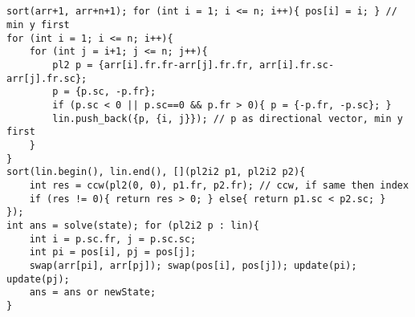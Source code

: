 \documentclass[landscape, 8pt, a4paper, oneside, twocolumn]{extarticle}
\begin{document}
\subsection{}
\begin{verbatim}
sort(arr+1, arr+n+1); for (int i = 1; i <= n; i++){ pos[i] = i; } // min y first
for (int i = 1; i <= n; i++){
    for (int j = i+1; j <= n; j++){
        pl2 p = {arr[i].fr.fr-arr[j].fr.fr, arr[i].fr.sc-arr[j].fr.sc};
        p = {p.sc, -p.fr};
        if (p.sc < 0 || p.sc==0 && p.fr > 0){ p = {-p.fr, -p.sc}; }
        lin.push_back({p, {i, j}}); // p as directional vector, min y first
    }
}
sort(lin.begin(), lin.end(), [](pl2i2 p1, pl2i2 p2){
    int res = ccw(pl2(0, 0), p1.fr, p2.fr); // ccw, if same then index
    if (res != 0){ return res > 0; } else{ return p1.sc < p2.sc; }
});
int ans = solve(state); for (pl2i2 p : lin){
    int i = p.sc.fr, j = p.sc.sc;
    int pi = pos[i], pj = pos[j];
    swap(arr[pi], arr[pj]); swap(pos[i], pos[j]); update(pi); update(pj);
    ans = ans or newState;
}
\end{verbatim}
\end{document}
